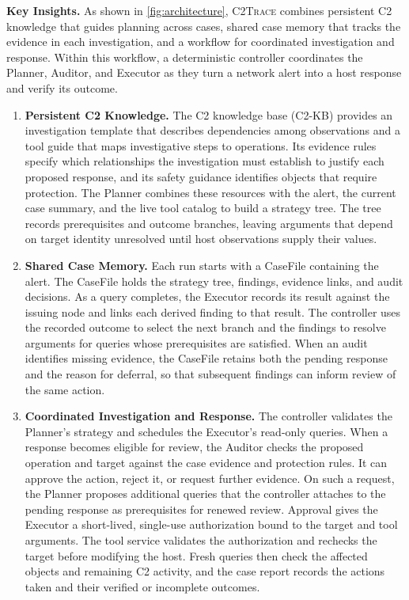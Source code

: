 \documentclass[pdflatex,sn-basic]{sn-jnl}
\DeclareRobustCommand{\circled}[1]{\textcircled{\scriptsize #1}}
\newcommand{\system}{\textsc{C2Trace}\xspace}
\begin{document}
\noindent\textbf{Key Insights.} As shown in \autoref{fig:architecture}, \system combines persistent C2 knowledge that guides planning across cases, shared case memory that tracks the evidence in each investigation, and a workflow for coordinated investigation and response. Within this workflow, a deterministic controller coordinates the Planner, Auditor, and Executor as they turn a network alert into a host response and verify its outcome.
\begin{enumerate}[noitemsep, topsep=1pt, partopsep=1pt, listparindent=\parindent, leftmargin=*, label=\circled{\arabic*}]
  \item \textbf{Persistent C2 Knowledge.} The C2 knowledge base (C2-KB) provides an investigation template that describes dependencies among observations and a tool guide that maps investigative steps to operations. Its evidence rules specify which relationships the investigation must establish to justify each proposed response, and its safety guidance identifies objects that require protection. The Planner combines these resources with the alert, the current case summary, and the live tool catalog to build a strategy tree. The tree records prerequisites and outcome branches, leaving arguments that depend on target identity unresolved until host observations supply their values.
  \item \textbf{Shared Case Memory.} Each run starts with a CaseFile containing the alert. The CaseFile holds the strategy tree, findings, evidence links, and audit decisions. As a query completes, the Executor records its result against the issuing node and links each derived finding to that result. The controller uses the recorded outcome to select the next branch and the findings to resolve arguments for queries whose prerequisites are satisfied. When an audit identifies missing evidence, the CaseFile retains both the pending response and the reason for deferral, so that subsequent findings can inform review of the same action.
  \item \textbf{Coordinated Investigation and Response.} The controller validates the Planner's strategy and schedules the Executor's read-only queries. When a response becomes eligible for review, the Auditor checks the proposed operation and target against the case evidence and protection rules. It can approve the action, reject it, or request further evidence. On such a request, the Planner proposes additional queries that the controller attaches to the pending response as prerequisites for renewed review. Approval gives the Executor a short-lived, single-use authorization bound to the target and tool arguments. The tool service validates the authorization and rechecks the target before modifying the host. Fresh queries then check the affected objects and remaining C2 activity, and the case report records the actions taken and their verified or incomplete outcomes.
\end{enumerate}
\end{document}
